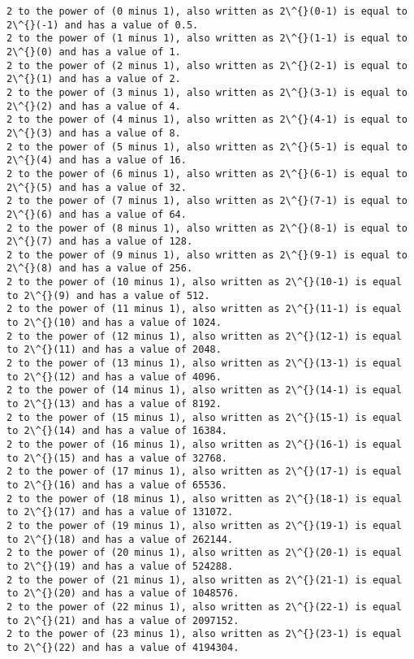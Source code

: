 \documentclass[11pt]{article}
\begin{document}
    \begin{Verbatim}[commandchars=\\\{\}]
2 to the power of (0 minus 1), also written as 2\^{}(0-1) is equal to 2\^{}(-1) and has a value of 0.5.
2 to the power of (1 minus 1), also written as 2\^{}(1-1) is equal to 2\^{}(0) and has a value of 1.
2 to the power of (2 minus 1), also written as 2\^{}(2-1) is equal to 2\^{}(1) and has a value of 2.
2 to the power of (3 minus 1), also written as 2\^{}(3-1) is equal to 2\^{}(2) and has a value of 4.
2 to the power of (4 minus 1), also written as 2\^{}(4-1) is equal to 2\^{}(3) and has a value of 8.
2 to the power of (5 minus 1), also written as 2\^{}(5-1) is equal to 2\^{}(4) and has a value of 16.
2 to the power of (6 minus 1), also written as 2\^{}(6-1) is equal to 2\^{}(5) and has a value of 32.
2 to the power of (7 minus 1), also written as 2\^{}(7-1) is equal to 2\^{}(6) and has a value of 64.
2 to the power of (8 minus 1), also written as 2\^{}(8-1) is equal to 2\^{}(7) and has a value of 128.
2 to the power of (9 minus 1), also written as 2\^{}(9-1) is equal to 2\^{}(8) and has a value of 256.
2 to the power of (10 minus 1), also written as 2\^{}(10-1) is equal to 2\^{}(9) and has a value of 512.
2 to the power of (11 minus 1), also written as 2\^{}(11-1) is equal to 2\^{}(10) and has a value of 1024.
2 to the power of (12 minus 1), also written as 2\^{}(12-1) is equal to 2\^{}(11) and has a value of 2048.
2 to the power of (13 minus 1), also written as 2\^{}(13-1) is equal to 2\^{}(12) and has a value of 4096.
2 to the power of (14 minus 1), also written as 2\^{}(14-1) is equal to 2\^{}(13) and has a value of 8192.
2 to the power of (15 minus 1), also written as 2\^{}(15-1) is equal to 2\^{}(14) and has a value of 16384.
2 to the power of (16 minus 1), also written as 2\^{}(16-1) is equal to 2\^{}(15) and has a value of 32768.
2 to the power of (17 minus 1), also written as 2\^{}(17-1) is equal to 2\^{}(16) and has a value of 65536.
2 to the power of (18 minus 1), also written as 2\^{}(18-1) is equal to 2\^{}(17) and has a value of 131072.
2 to the power of (19 minus 1), also written as 2\^{}(19-1) is equal to 2\^{}(18) and has a value of 262144.
2 to the power of (20 minus 1), also written as 2\^{}(20-1) is equal to 2\^{}(19) and has a value of 524288.
2 to the power of (21 minus 1), also written as 2\^{}(21-1) is equal to 2\^{}(20) and has a value of 1048576.
2 to the power of (22 minus 1), also written as 2\^{}(22-1) is equal to 2\^{}(21) and has a value of 2097152.
2 to the power of (23 minus 1), also written as 2\^{}(23-1) is equal to 2\^{}(22) and has a value of 4194304.

\end{Verbatim}
\end{document}
